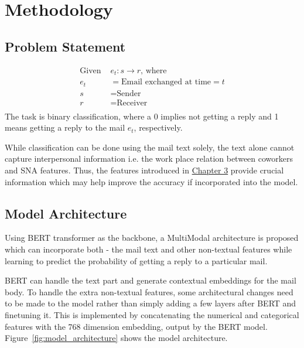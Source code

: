 
\chapter{Methodology} %

\label{Chapter4} %


\section{Problem Statement}
\begin{equation}
\begin{aligned}
\text{Given }&e_t : s \rightarrow r \text{, where}\\
e_t &= \text{Email exchanged at time} = t \\ s &= \text{Sender} \\  r &= \text{Receiver} \\ 
\end{aligned}
\end{equation}
The task is binary classification, where a 0 implies not getting a reply and 1 means getting a reply to the mail $e_t$, respectively.

While classification can be done using the mail text solely, the text alone cannot capture interpersonal information i.e.  the work place relation between coworkers and SNA features. Thus, the features introduced in \hyperref[Chapter3]{Chapter 3} provide crucial information which may help improve the accuracy if incorporated into the model. 


\section{Model Architecture}

Using BERT transformer as the backbone, a MultiModal architecture is proposed which can incorporate both - the mail text and other non-textual features while learning to predict the probability of getting a reply to a particular mail. 

BERT can handle the text part and generate contextual embeddings for the mail body. To handle the extra non-textual features, some architectural changes need to be made to the model rather than simply adding a few layers after BERT and finetuning it. This is implemented by concatenating the numerical and categorical features with the 768 dimension embedding\cite{gu-budhkar-2021-package}, output by the BERT model. Figure~\ref{fig:model_architecture} shows the model architecture.

